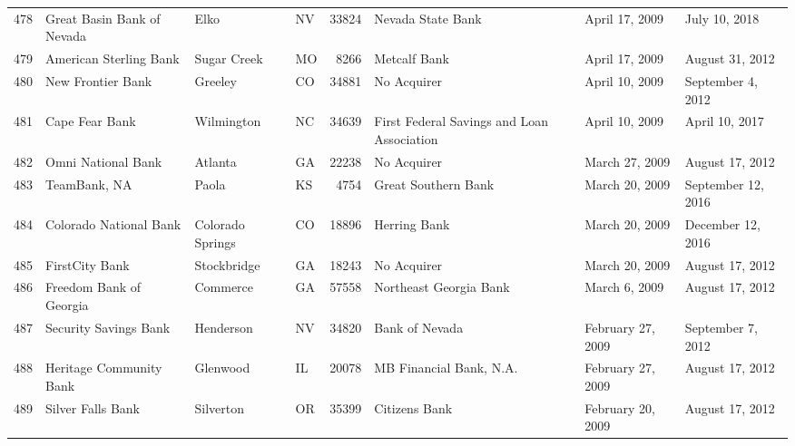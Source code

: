 \begin{tabular}{llllrlll}
478 &                         Great Basin Bank of Nevada &                Elko &  NV &  33824 &                                  Nevada State Bank &      April 17, 2009 &       July 10, 2018 \\
479 &                             American Sterling Bank &         Sugar Creek &  MO &   8266 &                                       Metcalf Bank &      April 17, 2009 &     August 31, 2012 \\
480 &                                  New Frontier Bank &             Greeley &  CO &  34881 &                                        No Acquirer &      April 10, 2009 &   September 4, 2012 \\
481 &                                     Cape Fear Bank &          Wilmington &  NC &  34639 &         First Federal Savings and Loan Association &      April 10, 2009 &      April 10, 2017 \\
482 &                                 Omni National Bank &             Atlanta &  GA &  22238 &                                        No Acquirer &      March 27, 2009 &     August 17, 2012 \\
483 &                                       TeamBank, NA &               Paola &  KS &   4754 &                                Great Southern Bank &      March 20, 2009 &  September 12, 2016 \\
484 &                             Colorado National Bank &    Colorado Springs &  CO &  18896 &                                       Herring Bank &      March 20, 2009 &   December 12, 2016 \\
485 &                                     FirstCity Bank &         Stockbridge &  GA &  18243 &                                        No Acquirer &      March 20, 2009 &     August 17, 2012 \\
486 &                            Freedom Bank of Georgia &            Commerce &  GA &  57558 &                             Northeast Georgia Bank &       March 6, 2009 &     August 17, 2012 \\
487 &                              Security Savings Bank &           Henderson &  NV &  34820 &                                     Bank of Nevada &   February 27, 2009 &   September 7, 2012 \\
488 &                            Heritage Community Bank &            Glenwood &  IL &  20078 &                            MB Financial Bank, N.A. &   February 27, 2009 &     August 17, 2012 \\
489 &                                  Silver Falls Bank &           Silverton &  OR &  35399 &                                      Citizens Bank &   February 20, 2009 &     August 17, 2012 \\

\end{tabular}
